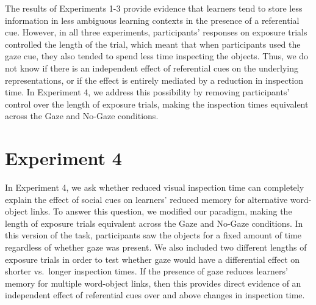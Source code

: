 \documentclass[authoryear, review]{elsarticle}
\begin{document}
The results of Experiments 1-3 provide evidence that learners tend to
store less information in less ambiguous learning contexts in the
presence of a referential cue. However, in all three experiments,
participants' responses on exposure trials controlled the length of the
trial, which meant that when participants used the gaze cue, they also
tended to spend less time inspecting the objects. Thus, we do not know
if there is an independent effect of referential cues on the underlying
representations, or if the effect is entirely mediated by a reduction in
inspection time. In Experiment 4, we address this possibility by
removing participants' control over the length of exposure trials,
making the inspection times equivalent across the Gaze and No-Gaze
conditions.

\section{Experiment 4}\label{experiment-4}

In Experiment 4, we ask whether reduced visual inspection time can
completely explain the effect of social cues on learners' reduced memory
for alternative word-object links. To answer this question, we modified
our paradigm, making the length of exposure trials equivalent across the
Gaze and No-Gaze conditions. In this version of the task, participants
saw the objects for a fixed amount of time regardless of whether gaze
was present. We also included two different lengths of exposure trials
in order to test whether gaze would have a differential effect on
shorter vs.~longer inspection times. If the presence of gaze reduces
learners' memory for multiple word-object links, then this provides
direct evidence of an independent effect of referential cues over and
above changes in inspection time.
\end{document}
